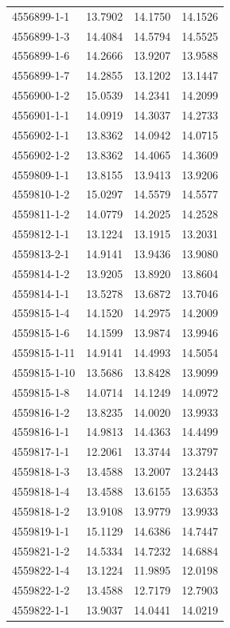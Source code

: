 \begin{longtable}{lrrr}
4556899-1-1 & 13.7902 & 14.1750 & 14.1526 \\
4556899-1-3 & 14.4084 & 14.5794 & 14.5525 \\
4556899-1-6 & 14.2666 & 13.9207 & 13.9588 \\
4556899-1-7 & 14.2855 & 13.1202 & 13.1447 \\
4556900-1-2 & 15.0539 & 14.2341 & 14.2099 \\
4556901-1-1 & 14.0919 & 14.3037 & 14.2733 \\
4556902-1-1 & 13.8362 & 14.0942 & 14.0715 \\
4556902-1-2 & 13.8362 & 14.4065 & 14.3609 \\
4559809-1-1 & 13.8155 & 13.9413 & 13.9206 \\
4559810-1-2 & 15.0297 & 14.5579 & 14.5577 \\
4559811-1-2 & 14.0779 & 14.2025 & 14.2528 \\
4559812-1-1 & 13.1224 & 13.1915 & 13.2031 \\
4559813-2-1 & 14.9141 & 13.9436 & 13.9080 \\
4559814-1-2 & 13.9205 & 13.8920 & 13.8604 \\
4559814-1-1 & 13.5278 & 13.6872 & 13.7046 \\
4559815-1-4 & 14.1520 & 14.2975 & 14.2009 \\
4559815-1-6 & 14.1599 & 13.9874 & 13.9946 \\
4559815-1-11 & 14.9141 & 14.4993 & 14.5054 \\
4559815-1-10 & 13.5686 & 13.8428 & 13.9099 \\
4559815-1-8 & 14.0714 & 14.1249 & 14.0972 \\
4559816-1-2 & 13.8235 & 14.0020 & 13.9933 \\
4559816-1-1 & 14.9813 & 14.4363 & 14.4499 \\
4559817-1-1 & 12.2061 & 13.3744 & 13.3797 \\
4559818-1-3 & 13.4588 & 13.2007 & 13.2443 \\
4559818-1-4 & 13.4588 & 13.6155 & 13.6353 \\
4559818-1-2 & 13.9108 & 13.9779 & 13.9933 \\
4559819-1-1 & 15.1129 & 14.6386 & 14.7447 \\
4559821-1-2 & 14.5334 & 14.7232 & 14.6884 \\
4559822-1-4 & 13.1224 & 11.9895 & 12.0198 \\
4559822-1-2 & 13.4588 & 12.7179 & 12.7903 \\
4559822-1-1 & 13.9037 & 14.0441 & 14.0219 \\

\end{longtable}
